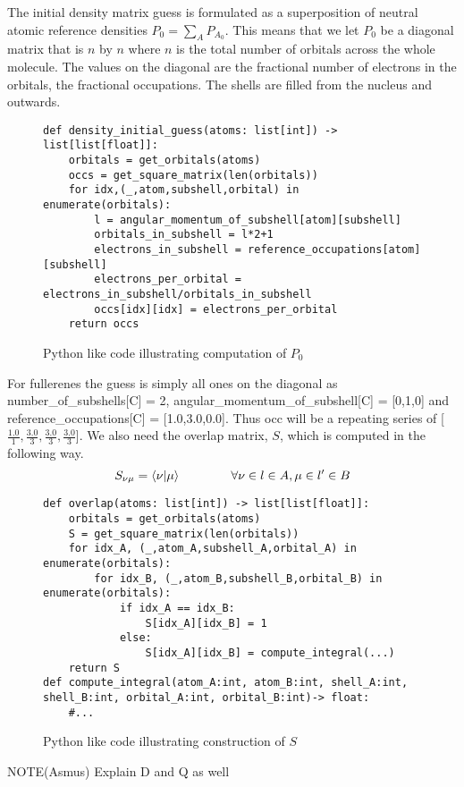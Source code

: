 The initial density matrix guess is formulated as a superposition of neutral atomic reference densities $P_0 = \sum_{A}P_{A_0}$. This means that we let $P_0$ be a diagonal matrix that is $n$ by $n$ where $n$ is the total number of orbitals across the whole molecule. The values on the diagonal are the fractional number of electrons in the orbitals, the fractional occupations. The shells are filled from the nucleus and outwards. 
\begin{figure}[H]
\begin{verbatim}
def density_initial_guess(atoms: list[int]) -> list[list[float]]:
    orbitals = get_orbitals(atoms)
    occs = get_square_matrix(len(orbitals))
    for idx,(_,atom,subshell,orbital) in enumerate(orbitals):
        l = angular_momentum_of_subshell[atom][subshell] 
        orbitals_in_subshell = l*2+1 
        electrons_in_subshell = reference_occupations[atom][subshell]
        electrons_per_orbital = electrons_in_subshell/orbitals_in_subshell
        occs[idx][idx] = electrons_per_orbital
    return occs
\end{verbatim}
\caption{Python like code illustrating computation of $P_0$}
\end{figure}
For fullerenes the guess is simply all ones on the diagonal as number\_of\_subshells[C] = 2, angular\_momentum\_of\_subshell[C] = [0,1,0] and reference\_occupations[C] = [1.0,3.0,0.0]. Thus occ will be a repeating series of [$\frac{1.0}{1},\frac{3.0}{3},\frac{3.0}{3},\frac{3.0}{3}$].
We also need the overlap matrix, $S$, which is computed in the following way.
\begin{equation}
S_{\nu\mu} = \braket{\nu|\mu}\quad\quad\quad\quad\forall \nu \in l \in A,\mu \in l' \in B
\end{equation}
\begin{figure}[H]
\begin{verbatim}
def overlap(atoms: list[int]) -> list[list[float]]:
    orbitals = get_orbitals(atoms)
    S = get_square_matrix(len(orbitals))
    for idx_A, (_,atom_A,subshell_A,orbital_A) in enumerate(orbitals):
        for idx_B, (_,atom_B,subshell_B,orbital_B) in enumerate(orbitals):
            if idx_A == idx_B:
                S[idx_A][idx_B] = 1
            else:
                S[idx_A][idx_B] = compute_integral(...)
    return S
def compute_integral(atom_A:int, atom_B:int, shell_A:int, shell_B:int, orbital_A:int, orbital_B:int)-> float:
    #...
\end{verbatim}
\caption{Python like code illustrating construction of $S$}
\end{figure}
NOTE(Asmus) Explain D and Q as well


